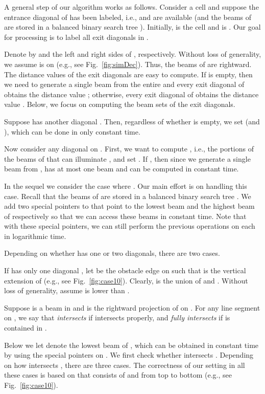 \documentclass[english,runningheads,11pt]{llncs-revised}
\begin{document}
A general step of our algorithm works as follows. Consider a cell 
and suppose the entrance diagonal  of  has been labeled, i.e.,
 and  are available (and the beams of  are stored
in a balanced binary search tree ).
Initially,  is the cell  and  is .
Our goal for processing  is to label
all exit diagonals in .


Denote by  and  the
left and right sides of , respectively. Without loss of generality, we assume 
is on  (e.g., see Fig.~\ref{fig:simDec}).
Thus, the beams of  are rightward.
The distance values of the exit diagonals are easy to compute. If 
is empty, then we need to generate a single beam from the entire  and
every exit diagonal of  obtains the distance value ; otherwise,
every exit diagonal of  obtains the distance value .
Below, we focus on computing the beam sets of the exit
diagonals.

Suppose  has another diagonal . Then, regardless of
whether  is empty, we set  (and ), which
can be done in only constant time.

Now consider any diagonal  on .  First, we want to compute , i.e., the portions of the beams of  that can illuminate , and set . If , then since we generate a single beam from
,  has at most one beam
and can be computed in constant time.

In the sequel we consider the case where
. Our main effort is on handling this case.
Recall that the beams of  are stored in a
balanced binary search tree . We add two special pointers to
 that point to
the lowest beam and the highest beam of  respectively so that we
can access these beams in constant time. Note that with these special
pointers, we can still perform the previous operations on
 each in logarithmic time.

Depending on whether  has one or two diagonals, there are two
cases.

If  has only one diagonal , let  be the obstacle edge on  such that 
is the vertical extension of  (e.g., see Fig.~\ref{fig:case10}). Clearly,  is the union of  and .
Without loss of generality, assume  is lower than .

Suppose  is a beam in  and  is the rightward
projection of  on . For any line segment  on ,
we say that  {\em intersects}  if 
intersects  properly, and  {\em fully intersects}  if  is
contained in .



Below we let  denote the lowest beam of
, which can be obtained in constant time by using the special
pointers on .
We first check whether  intersects .
Depending on how  intersects , there are three cases. The correctness of our setting in all these cases is based on that  consists of  and  from top to bottom (e.g., see Fig.~\ref{fig:case10}).
\end{document}
